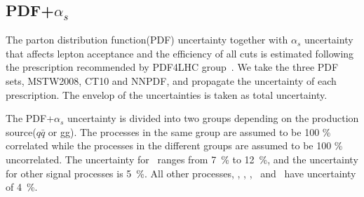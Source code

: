 \subsection{PDF+$\alpha_s$}

The parton distribution function(PDF) uncertainty together with $\alpha_s$ uncertainty 
that affects lepton acceptance and the efficiency of all cuts 
is estimated following the prescription recommended by PDF4LHC group~\cite{Botje:2011sn}. 
We take the three PDF sets, MSTW2008, CT10 and NNPDF, 
and propagate the uncertainty of each prescription. 
The envelop of the uncertainties is taken as total uncertainty. 

The PDF+$\alpha_s$ uncertainty is divided into two groups depending on the 
production source($q\bar{q}$ or gg). 
The processes in the same group are assumed to be 100 \% correlated 
while the processes in the different groups are assumed to be 100 \% uncorrelated.
The uncertainty for \ggH\ ranges from 7~\% to 12~\%,  
and the uncertainty for other signal processes is 5~\%.
All other processes, \ggww, \qqww, \vv, \wgamma\ and \wgammastar\ have uncertainty of 4~\%.

